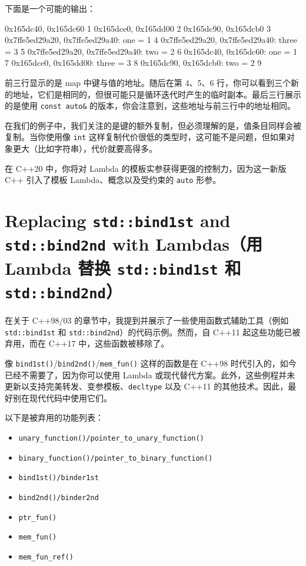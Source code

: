 下面是一个可能的输出：

\begin{codebox}
0x165dc40, 0x165dc60
1
0x165dce0, 0x165dd00
2
0x165dc90, 0x165dcb0
3
0x7ffe5ed29a20, 0x7ffe5ed29a40: one = 1
4
0x7ffe5ed29a20, 0x7ffe5ed29a40: three = 3
5
0x7ffe5ed29a20, 0x7ffe5ed29a40: two = 2
6
0x165dc40, 0x165dc60: one = 1
7
0x165dce0, 0x165dd00: three = 3
8
0x165dc90, 0x165dcb0: two = 2
9
\end{codebox}

前三行显示的是 map 中键与值的地址。随后在第 4、5、6 行，你可以看到三个新的地址，它们是相同的，但很可能只是循环迭代时产生的临时副本。最后三行展示的是使用 \texttt{const auto\&} 的版本，你会注意到，这些地址与前三行中的地址相同。

在我们的例子中，我们关注的是键的额外复制，但必须理解的是，值条目同样会被复制。当你使用像 \texttt{int} 这样复制代价很低的类型时，这可能不是问题，但如果对象更大（比如字符串），代价就要高得多。


在 C++20 中，你将对 Lambda 的模板实参获得更强的控制力，因为这一新版 C++ 引入了模板 Lambda、概念以及受约束的 \texttt{auto} 形参。

\section{Replacing \texttt{std::bind1st} and \texttt{std::bind2nd} with Lambdas（用 Lambda 替换 \texttt{std::bind1st} 和 \texttt{std::bind2nd}）}

在关于 C++98/03 的章节中，我提到并展示了一些使用函数式辅助工具（例如 \texttt{std::bind1st} 和 \texttt{std::bind2nd}）的代码示例。然而，自 C++11 起这些功能已被弃用，而在 C++17 中，这些函数被移除了。

像 \texttt{bind1st()}/\texttt{bind2nd()}/\texttt{mem\_fun()} 这样的函数是在 C++98 时代引入的，如今已经不需要了，因为你可以使用 Lambda 或现代替代方案。此外，这些例程并未更新以支持完美转发、变参模板、\texttt{decltype} 以及 C++11 的其他技术。因此，最好别在现代代码中使用它们。

以下是被弃用的功能列表：

\begin{itemize}
\item \texttt{unary\_function()/pointer\_to\_unary\_function()}
\item \texttt{binary\_function()/pointer\_to\_binary\_function()}
\item \texttt{bind1st()/binder1st}
\item \texttt{bind2nd()/binder2nd}
\item \texttt{ptr\_fun()}
\item \texttt{mem\_fun()}
\item \texttt{mem\_fun\_ref()}
\end{itemize}

